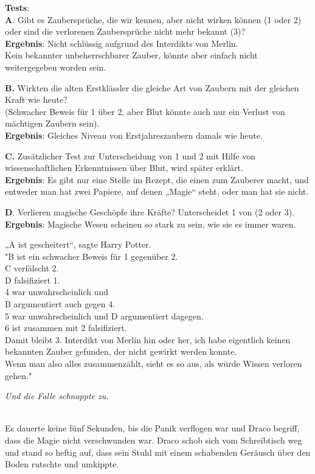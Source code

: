 {\textbf{Tests}:\\ \textbf{A}. Gibt es Zaubersprüche, die wir kennen, aber nicht wirken können (1 oder 2) oder sind die verlorenen Zaubersprüche nicht mehr bekannt (3)?\\ \textbf{Ergebnis}: Nicht schlüssig aufgrund des Interdikts von Merlin.\\ Kein bekannter unbeherrschbarer Zauber, könnte aber einfach nicht weitergegeben worden sein.

\textbf{B.} Wirkten die alten Erstklässler die gleiche Art von Zaubern mit der gleichen Kraft wie heute?\\ (Schwacher Beweis für 1 über 2, aber Blut könnte auch nur ein Verlust von mächtigen Zaubern sein).\\ \textbf{Ergebnis}: Gleiches Niveau von Erstjahreszaubern damals wie heute.

\textbf{C.} Zusätzlicher Test zur Unterscheidung von 1 und 2 mit Hilfe von wissenschaftlichen Erkenntnissen über Blut, wird später erklärt.\\ \textbf{Ergebnis}: Es gibt nur eine Stelle im Rezept, die einen zum Zauberer macht, und entweder man hat zwei Papiere, auf denen „Magie“ steht, oder man hat sie nicht.

\textbf{D}. Verlieren magische Geschöpfe ihre Kräfte? Unterscheidet 1 von (2 oder 3). \textbf{Ergebnis}: Magische Wesen scheinen so stark zu sein, wie sie es immer waren.

„A ist gescheitert“, sagte Harry Potter.\\ "B ist ein schwacher Beweis für 1 gegenüber 2.\\ C verfälscht 2.\\ D falsifiziert 1.\\ 4 war unwahrscheinlich und\\ B argumentiert auch gegen 4.\\ 5 war unwahrscheinlich und D argumentiert dagegen.\\ 6 ist zusammen mit 2 falsifiziert.\\ Damit bleibt 3. Interdikt von Merlin hin oder her, ich habe eigentlich keinen bekannten Zauber gefunden, der nicht gewirkt werden konnte.\\ Wenn man also alles zusammenzählt, sieht es so aus, als würde Wissen verloren gehen."

\emph{Und die Falle schnappte zu.\\ }\strut \\ Es dauerte keine fünf Sekunden, bis die Panik verflogen war und Draco begriff, dass die Magie nicht verschwunden war. Draco schob sich vom Schreibtisch weg und stand so heftig auf, dass sein Stuhl mit einem schabenden Geräusch über den Boden rutschte und umkippte.

}
